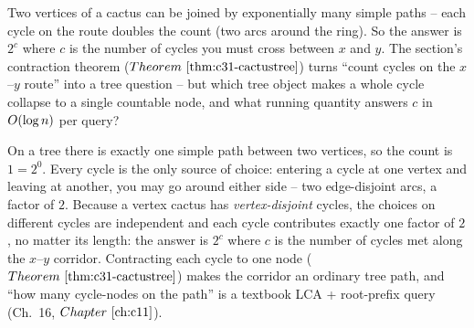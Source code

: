 \begin{attemptgate}
Two vertices of a cactus can be joined by exponentially many simple paths -- each
cycle on the route doubles the count (two arcs around the ring).  So the answer is
\(2^{c}\) where \(c\) is the number of cycles you must cross between \(x\) and
\(y\).  The section's contraction theorem (\(\thmref{c31-cactustree}\)) turns
``count cycles on the \(x\)--\(y\) route'' into a tree question -- but which tree
object makes a whole cycle collapse to a single countable node, and what running
quantity answers \(c\) in \(O(\log n)\) per query?
\end{attemptgate}

On a tree there is exactly one simple path between two vertices, so the count is
\(1=2^{0}\).  Every cycle is the only source of choice: entering a cycle at one
vertex and leaving at another, you may go around either side -- two edge-disjoint
arcs, a factor of \(2\).  Because a vertex cactus has \emph{vertex-disjoint}
cycles, the choices on different cycles are independent and each cycle contributes
exactly one factor of \(2\), no matter its length: the answer is \(2^{c}\) where
\(c\) is the number of cycles met along the \(x\)--\(y\) corridor.  Contracting
each cycle to one node (\(\thmref{c31-cactustree}\)) makes the corridor an ordinary
tree path, and ``how many cycle-nodes on the path'' is a textbook LCA + root-prefix
query (Ch.~16, \(\chref{c11}\)).

